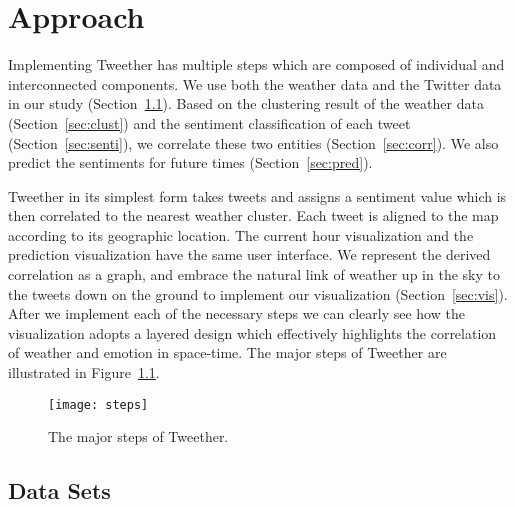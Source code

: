 \chapter{Approach}

Implementing Tweether has multiple steps which are composed of individual and interconnected components. We use both the weather data and the Twitter data in our study (Section~\ref{sec:dataset}). Based on the clustering result of the weather data (Section~\ref{sec:clust}) and the sentiment classification of each tweet (Section~\ref{sec:senti}), we correlate these two entities (Section~\ref{sec:corr}). We also predict the sentiments for future times (Section~\ref{sec:pred}).

Tweether in its simplest form takes tweets and assigns a sentiment value which is then correlated to the nearest weather cluster. Each tweet is aligned to the map according to its geographic location. The current hour visualization and the prediction visualization have the same user interface. We represent the derived correlation as a graph, and embrace the natural link of weather up in the sky to the tweets down on the ground to implement our visualization (Section~\ref{sec:vis}). After we implement each of the necessary steps we can clearly see how the visualization adopts a layered design which effectively highlights the correlation of weather and emotion in space-time. The major steps of Tweether are illustrated in Figure~\ref{fig:steps}.

\begin{figure}[t]
 \centering
 \texttt{[image: steps]}
 \caption{The major steps of Tweether.}
 \label{fig:steps}
\end{figure}



\section{Data Sets}
\label{sec:dataset}

